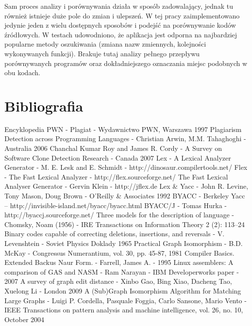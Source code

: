 \documentclass[a4paper,12pt]{article}
\begin{document}
Sam proces analizy i porównywania działa w sposób zadowalający, jednak tu również istnieje duże pole do zmian i ulepszeń. W tej pracy zaimplementowano jedynie jeden z wielu dostępnych sposobów i podejść na porównywanie kodów źródłowych. W testach udowodniono, że aplikacja jest odporna na najbardziej popularne metody oszukiwania (zmiana nazw zmiennych, kolejności wykonywanych funkcji). Brakuje tutaj analizy pełnego przepływu porównywanych programów oraz dokładniejszego oznaczania miejsc podobnych w obu kodach.

\newpage

\section{Bibliografia}

\begin{thebibliography}{1}
 Encyklopedia PWN - Plagiat - Wydawnictwo PWN, Warszawa 1997
 Plagiarism Detection across Programming Languages - Christian Arwin, M.M. Tahaghoghi - Australia 2006
 Chanchal Kumar Roy and James R. Cordy - A Survey on Software Clone Detection Research - Canada 2007
 Lex - A Lexical Analyzer Generator - M. E. Lesk and E. Schmidt - http://dinosaur.compilertools.net/
 Flex - The Fast Lexical Analyzer - http://flex.sourceforge.net/
 The Fast Lexical Analyser Generator - Gervin Klein - http://jflex.de
 Lex & Yacc - John R. Levine, Tony Mason, Doug Brown - O'Reilly & Associates 1992
 BYACC - Berkeley Yacc -- http://invisible-island.net/byacc/byacc.html
 BYACC/J - Tomas Hurka - http://byaccj.sourceforge.net/
 Three models for the description of language - Chomsky, Noam (1956) - IRE Transactions on Information Theory 2 (2): 113–24
 Binary codes capable of correcting deletions, insertions, and reversals - V. Levenshtein - Soviet Physics Doklady 1965
 Practical Graph Isomorphism - B.D. McKay - Congressus Numerantium,
vol. 30, pp. 45-87, 1981
 Compiler Basics. Extended Backus Naur Form. - Farrell, James A. - 1995
 Linux assemblers: A comparison of GAS and NASM - Ram Narayan - IBM Developerworks paper - 2007
 A survey of graph edit distance - Xinbo Gao, Bing Xiao, Dacheng Tao, Xuelong Li - London 2009
 A (Sub)Graph Isomorphism Algorithm for Matching Large Graphs - Luigi P. Cordella, Pasquale Foggia, Carlo Sansone, Mario Vento - IEEE Transactions on pattern analysis and machine intelligence, vol. 26, no. 10, October 2004

\end{thebibliography}
\end{document}
